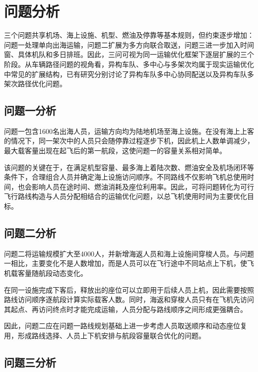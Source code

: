 \section{问题分析}\label{sec:problem-analysis}

三个问题共享机场、海上设施、机型、燃油及停靠等基本规则，但约束逐步增加：问题一处理单向出海运输，问题二扩展为多方向联合取送，问题三进一步加入时间窗、具体机队和多日排班。因此，三问可视为同一运输优化框架下逐层扩展的三个阶段。从车辆路径问题的视角看，异构车队、多中心与多架次均属于现实运输优化中常见的扩展结构，已有研究分别讨论了异构车队多中心协同配送以及异构车队多架次路径优化问题\cite{liang2024,sethanan2020}。

\subsection{问题一分析}\label{subsec:q1-analysis}

问题一包含1600名出海人员，运输方向均为陆地机场至海上设施。在没有海上上客的情况下，同一架次中的人员只会随停靠过程逐步下机，因此机上人数单调减少，最大载客量出现在起飞后的第一航段，这使问题一的容量关系相对简单。

该问题的关键在于，在满足机型容量、最多海上着陆次数、燃油安全及机场闭环等条件下，合理组合人员并确定海上设施访问顺序。不同路线不仅影响飞机总使用时间，也会影响人员在途时间、燃油消耗及座位利用率。因此，可将问题转化为可行飞行路线构造与人员分配相结合的运输优化问题，以总飞机使用时间为主要优化目标。

\subsection{问题二分析}\label{subsec:q2-analysis}

问题二将运输规模扩大至4000人，并新增海返人员和海上设施间穿梭人员。与问题一相比，主要变化不是人数增加，而是人员可以在飞行途中不同站点上下机，使飞机载客量随航段动态变化。

在同一设施完成下客后，释放出的座位可以立即用于后续人员上机，因此需要按照路线访问顺序逐航段计算实际载客人数。同时，海返和穿梭人员只有在飞机先访问其起点、再访问终点时才能完成运输，人员分配与路线顺序之间形成更强耦合。

因此，问题二应在问题一路线规划基础上进一步考虑人员取送顺序和动态座位复用，形成路线选择、人员上下机安排与航段容量联合优化的问题。

\subsection{问题三分析}\label{subsec:q3-analysis}

